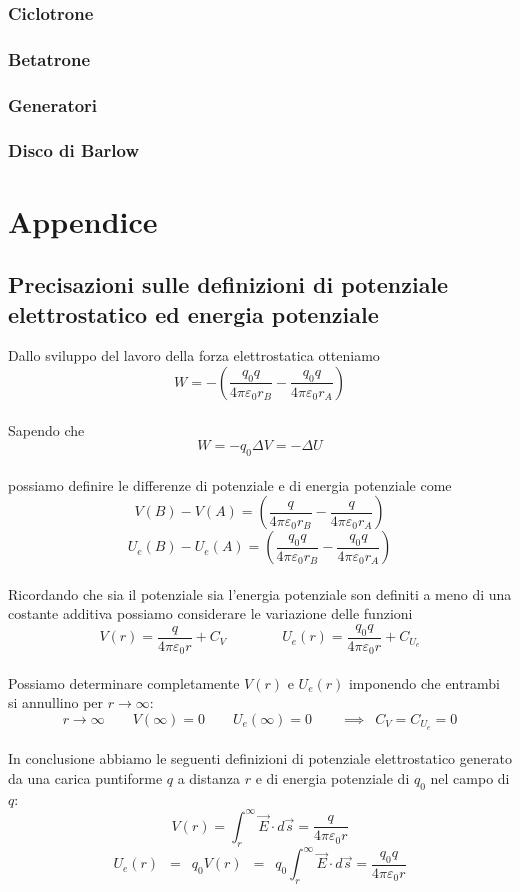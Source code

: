 \documentclass[x11names]{report}
\begin{document}
\subsection{Ciclotrone}
\subsection{Betatrone}
\subsection{Generatori}
\subsection{Disco di Barlow}


\chapter{Appendice}
\section{Precisazioni sulle definizioni di potenziale elettrostatico ed energia potenziale}\label{precisazioni potenziale}
Dallo sviluppo del lavoro della forza elettrostatica otteniamo
\[
W = -\left(\frac{q_0 q}{4\pi \varepsilon_0 r_B} - \frac{q_0 q}{4\pi \varepsilon_0 r_A}\right)
\]\\
Sapendo che
\[
W = -q_0 \Delta V = -\Delta U 
\]\\
possiamo definire le differenze di potenziale e di energia potenziale come
\[
V(B) - V(A) = \left(\frac{ q}{4\pi \varepsilon_0 r_B} - \frac{q}{4\pi \varepsilon_0 r_A}\right)
\]
\[
U_e(B) - U_e(A) = \left(\frac{q_0 q}{4\pi \varepsilon_0 r_B} - \frac{q_0q}{4\pi \varepsilon_0 r_A}\right)
\]\\
Ricordando che sia il potenziale sia l'energia potenziale son definiti a meno di una costante additiva possiamo considerare le variazione delle funzioni
\[
V(r) = \frac{q}{4\pi\varepsilon_0 r} + C_V\qquad \qquad U_e(r) = \frac{q_0q}{4\pi\varepsilon_0 r} + C_{U_e}
\]\\
Possiamo determinare completamente \(V(r)\) e \(U_e(r)\) imponendo che  entrambi si annullino per \(r\to\infty\):
\[
r\to \infty \qquad V(\infty) = 0 \qquad U_e(\infty) = 0 \qquad \implies \;\ C_V = C_{U_e} = 0
\]\\
In conclusione abbiamo le seguenti definizioni di potenziale elettrostatico generato da una carica puntiforme \(q\) a distanza \(r\) e di energia potenziale di \(q_0\) nel campo di \(q\):
\[
V(r) = \int_{r}^{\infty} \vec{E}\cdot d\vec{s} = \frac{q}{4\pi\varepsilon_0 r}
\]
\[
U_e(r) \;\ = \;\ q_0V(r) \;\ = \;\ q_0\int_{r}^{\infty} \vec{E}\cdot d\vec{s} = \frac{q_0q}{4\pi\varepsilon_0 r}
\]
\end{document}
